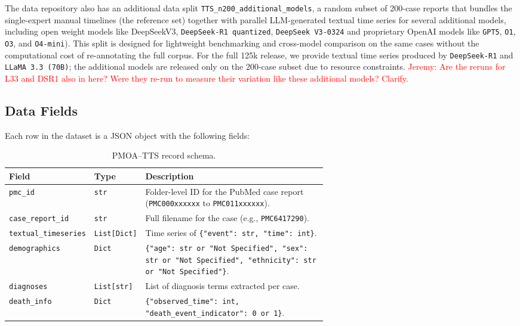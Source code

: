 The data repository also has an additional data split \texttt{TTS\_n200\_additional\_models}, a random subset of 200-case reports that bundles the single-expert manual timelines (the reference set) together with parallel LLM-generated textual time series for several additional models, including open weight models like DeepSeekV3, \texttt{DeepSeek-R1 quantized}, \texttt{DeepSeek V3-0324} and proprietary OpenAI models like \texttt{GPT5}, \texttt{O1}, \texttt{O3}, and \texttt{O4-mini}). This split is designed for lightweight benchmarking and cross-model comparison on the same cases without the computational cost of re-annotating the full corpus. For the full 125k release, we provide textual time series produced by \texttt{DeepSeek-R1} and \texttt{LLaMA 3.3 (70B)}; the additional models are released only on the 200-case subset due to resource constraints.
\textcolor{red}{Jeremy: Are the reruns for L33 and DSR1 also in here?  Were they re-run to measure their variation like these additional models?  Clarify.}
\subsection{Data Fields}
Each row in the dataset is a JSON object with the following fields:
\begin{table}[!htbp]
\centering
\caption{PMOA--TTS record schema.}
\label{tab:data_schema}
\begin{tabular}{@{} l l p{0.62\linewidth} @{}}
\toprule
\textbf{Field} & \textbf{Type} & \textbf{Description} \\
\midrule
\texttt{pmc\_id} & \texttt{str} & Folder-level ID for the PubMed case report (\texttt{PMC000xxxxxx} to \texttt{PMC011xxxxxx}). \\
\texttt{case\_report\_id} & \texttt{str} & Full filename for the case (e.g., \texttt{PMC6417290}). \\
\texttt{textual\_timeseries} & \texttt{List[Dict]} & Time series of \texttt{\{"event": str, "time": int\}}. \\
\texttt{demographics} & \texttt{Dict} & \texttt{\{"age": str or "Not Specified", "sex": str or "Not Specified", "ethnicity": str or "Not Specified"\}}. \\
\texttt{diagnoses} & \texttt{List[str]} & List of diagnosis terms extracted per case. \\
\texttt{death\_info} & \texttt{Dict} & \texttt{\{"observed\_time": int, "death\_event\_indicator": 0 or 1\}}. \\
\bottomrule
\end{tabular}
\end{table}

